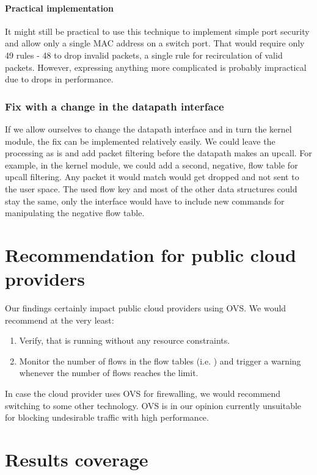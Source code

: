 \paragraph{Practical implementation}
It might still be practical to use this technique to implement simple port security and allow only a single MAC address on a switch port. That would require only 49 rules - 48 to drop invalid packets, a single rule for recirculation of valid packets. However, expressing anything more complicated is probably impractical due to drops in performance.

\subsubsection{Fix with a change in the datapath interface}

If we allow ourselves to change the datapath interface and in turn the kernel module, the fix can be implemented relatively easily. We could leave the processing as is and add packet filtering before the datapath makes an upcall. For example, in the kernel module, we could add a second, negative, flow table for upcall filtering. Any packet it would match would get dropped and not sent to the user space. The used flow key and most of the other data structures could stay the same, only the interface would have to include new commands for manipulating the negative flow table.


\section{Recommendation for public cloud providers}

Our findings certainly impact public cloud providers using OVS. We would recommend at the very least:

\begin{enumerate}
    \item Verify, that  is running without any resource constraints.
    \item Monitor the number of flows in the flow tables (i.e. ) and trigger a warning whenever the number of flows reaches the limit.
\end{enumerate}

In case the cloud provider uses OVS for firewalling, we would recommend switching to some other technology. OVS is in our opinion currently unsuitable for blocking undesirable traffic with high performance.


\section{Results coverage}

